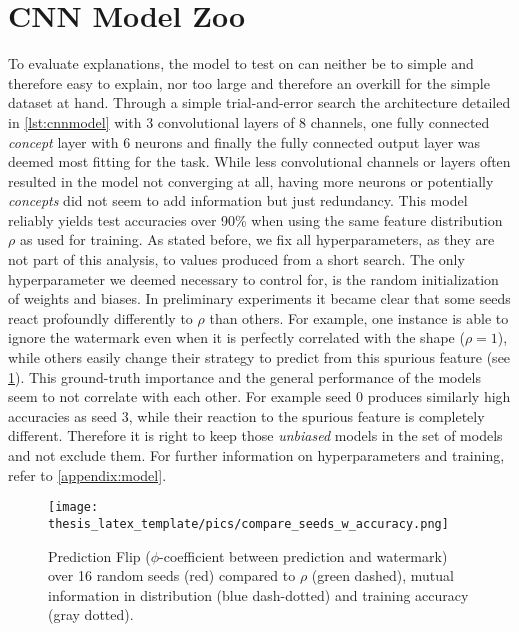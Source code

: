 \section{CNN Model Zoo}\label{section:training}
To evaluate explanations, the model to test on can neither be to simple and therefore easy to explain, nor too large and therefore an overkill for the simple dataset at hand.
Through a simple trial-and-error search the architecture detailed in \autoref{lst:cnnmodel} with 3 convolutional layers of 8 channels, one fully connected \textit{concept} layer with 6 neurons and finally the fully connected output layer was deemed most fitting for the task. While less convolutional channels or layers often resulted in the model not converging at all, having more neurons or potentially \textit{concepts} did not seem to add information but just redundancy.
This model reliably yields test accuracies over 90\% when using the same feature distribution $\rho$ as used for training. As stated before, we fix all hyperparameters, as they are not part of this analysis, to values produced from a short search.
The only hyperparameter we deemed necessary to control for, is the random initialization of weights and biases. In preliminary experiments it became clear that some seeds react profoundly differently to $\rho$ than others. For example, one instance is able to ignore the watermark even when it is perfectly correlated with the shape ($\rho = 1$), while others easily change their strategy to predict from this spurious feature (see \cref{fig:gt_over_seeds}). This ground-truth importance and the general performance of the models seem to not correlate with each other. For example seed 0 produces similarly high accuracies as seed 3, while their reaction to the spurious feature is completely different. Therefore it is right to keep those \textit{unbiased} models in the set of models and not exclude them. 
For further information on hyperparameters and training, refer to \cref{appendix:model}.

\begin{figure}
    \centering
    \texttt{[image: thesis\_latex\_template/pics/compare\_seeds\_w\_accuracy.png]}
    \caption[Comparing Seeds]{Prediction Flip ($\phi$-coefficient between prediction and watermark) over 16 random seeds (red)
    compared to $\rho$ (green dashed), mutual information in distribution (blue dash-dotted) and training accuracy (gray dotted).
    }
    \label{fig:gt_over_seeds}
\end{figure}

